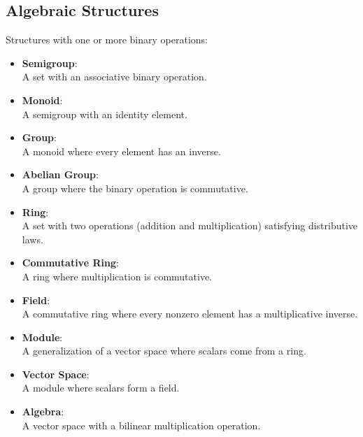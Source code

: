 \documentclass{article}
\begin{document}
\subsection{Algebraic Structures}
Structures with one or more binary operations:
\begin{itemize}
    \item \textbf{Semigroup}: \\
        A set with an associative binary operation.
    \item \textbf{Monoid}: \\
        A semigroup with an identity element.
    \item \textbf{Group}: \\
        A monoid where every element has an inverse.
    \item \textbf{Abelian Group}:\\ 
        A group where the binary operation is commutative.
    \item \textbf{Ring}: \\
        A set with two operations (addition and multiplication) 
        satisfying distributive laws.
    \item \textbf{Commutative Ring}:\\ 
        A ring where multiplication is commutative.
    \item \textbf{Field}: \\
        A commutative ring where every nonzero 
        element has a multiplicative inverse.
    \item \textbf{Module}: \\
        A generalization of a vector space where 
        scalars come from a ring.
    \item \textbf{Vector Space}: \\ 
        A module where scalars form a field.
    \item \textbf{Algebra}: \\
        A vector space with a bilinear multiplication operation.
\end{itemize}
\end{document}
